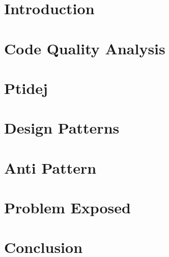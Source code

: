 {
\graphicspath{{TP2/}}
\newpage

\section{Introduction}
\label{sec:TP2/introduction}


%

\section{Code Quality Analysis}
\label{sec:TP2/context}


\section{Ptidej}
\label{sec:TP2/ptidej}


\section{Design Patterns}
\label{sec:TP2/patterns}


\section{Anti Pattern}
\label{sec:TP2/antipatterns}


\section{Problem Exposed}
\label{sec:TP2/p_exposed}



\newpage
\section{Conclusion}
\label{sec:TP2/conclusion}

}